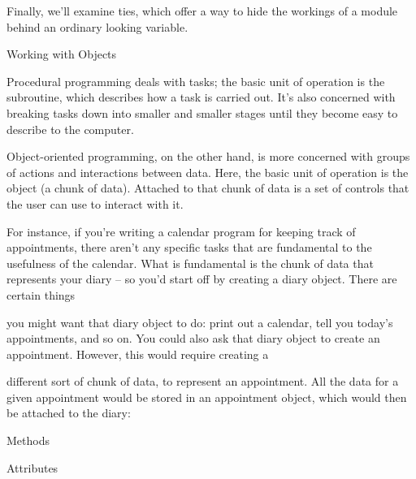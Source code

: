 \documentclass[a4paper,11pt]{book}
\begin{document}
\noindent 

\noindent Finally, we'll examine ties, which offer a way to hide the workings of a module behind an ordinary looking variable.

\noindent 

\noindent 

\noindent Working with Objects

\noindent Procedural programming deals with tasks; the basic unit of operation is the subroutine, which describes how a task is carried out. It's also concerned with breaking tasks down into smaller and smaller stages until they become easy to describe to the computer.

\noindent 

\noindent Object-oriented programming, on the other hand, is more concerned with groups of actions and interactions between data. Here, the basic unit of operation is the object (a chunk of data). Attached to that chunk of data is a set of controls that the user can use to interact with it.

\noindent 

\noindent For instance, if you're writing a calendar program for keeping track of appointments, there aren't any specific tasks that are fundamental to the usefulness of the calendar. What is fundamental is the chunk of data that represents your diary -- so you'd start off by creating a diary object. There are certain things

\noindent you might want that diary object to do: print out a calendar, tell you today's appointments, and so on. You could also ask that diary object to create an appointment. However, this would require creating a

\noindent different sort of chunk of data, to represent an appointment. All the data for a given appointment would be stored in an appointment object, which would then be attached to the diary:

\noindent  

\noindent  

\noindent  

\noindent  

\noindent 

\noindent 

\noindent 

\noindent Methods

\noindent 

\noindent 

\noindent 

\noindent Attributes
\end{document}

